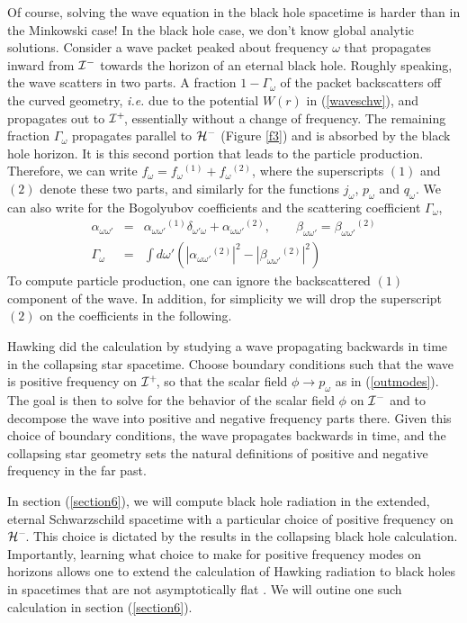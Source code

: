 \documentclass[12pt]{article}
\newcommand{\p}{\partial}
\def\bena{\begin{eqnarray}}
\def\eena{\end{eqnarray}}
\def\ph{{\cal H}^-}
\def\finf{{\cal I}^+}
\def\pinf{{\cal I}^-}
\def\f{f_{\omega}}
\def\p{p_{\omega}}
\def\q{q_{\omega}}
\def\j{j_{\omega}}
\def\alp{\alpha _{\omega \omega '}}
\def\bet{\beta_{\omega\omega '}}
\begin{document}
Of course, solving the wave equation in the black hole spacetime is
harder than in the Minkowski case!  In the black hole case, we don't know
global analytic
solutions. Consider a wave packet peaked about frequency $\omega$ that
propagates inward
from $\pinf$ towards the horizon of
an eternal black hole. Roughly speaking, the wave
scatters in two parts. A fraction $1-\Gamma _{\omega}$ of the packet
backscatters
off the  curved geometry, {\it i.e.} due to the potential $W(r)$ in
(\ref{waveschw}), and propagates
out to $\finf\!$, essentially without a change of frequency.
The remaining fraction $\Gamma _{\omega}$ propagates parallel to $\ph$ (Figure \ref{f3}) and
is absorbed by the black hole horizon. It is this second portion
that leads to the particle production.  Therefore, we can write
$\f=\f{}^{(1)}+\f{}^{(2)}$,
where the superscripts $(1)$ and $(2)$ denote these two parts, and
similarly for the
functions $\j$, $\p$ and $\q$.  We can also write for the Bogolyubov
coefficients and the
scattering coefficient $\Gamma_\omega$,
%
\bena\label{parts}\alp &=&\alp{}^{(1)} \delta_{\omega ' \omega}
+\alp{}^{(2)} ,\qquad
\bet =\bet {}^{(2)} \\
\Gamma_{\omega} &= &\int d\omega ' (|\alp {}^{(2)} |^2 - |\bet {}^{(2)}
|^2) \eena
%
To compute particle production, one can ignore the backscattered $(1)$
component of the wave.  In addition, for simplicity we will drop the
superscript $(2)$
on the coefficients in the following.

Hawking did the calculation by studying a wave propagating
backwards in time in the collapsing star spacetime.  Choose
boundary conditions such that the wave is positive frequency on $\finf\!$,
so that the scalar field $\phi\rightarrow\p$ as in (\ref{outmodes}).
The goal is then to solve for the behavior of the scalar field $\phi$ on
$\pinf$ and to decompose the wave into positive and negative frequency parts there.
Given this choice of boundary conditions, the wave propagates backwards in
time, and the collapsing star geometry sets the natural definitions
of positive and negative frequency in the far past.

In section (\ref{section6}), we will compute black hole radiation in the extended, eternal
Schwarzschild spacetime with a particular choice of positive frequency on $\ph\!$.
This choice is dictated by the results in the collapsing black hole calculation.
Importantly,
learning what choice to make for positive frequency modes on
horizons allows one to extend the calculation of Hawking radiation to black
holes
in spacetimes that are not asymptotically flat \cite{ktrnds}.  We will outine
one such calculation in section (\ref{section6}).
\end{document}
